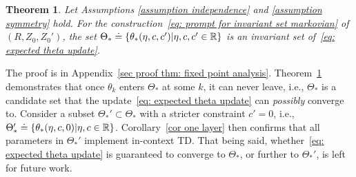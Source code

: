 \documentclass{article}
\newcommand{\R}{\mathbb{R}}
\newtheorem{theorem}{Theorem}
\begin{document}
\begin{theorem}
    Let Assumptions \ref{assumption independence} and \ref{assumption symmetry} hold.
    For the construction~\eqref{eq: prompt for invariant set markovian} of $(R, Z_0, Z_0')$,
    the set $\Theta_* \doteq \qty{\theta_*(\eta, c, c') | \eta, c, c' \in \R}$ is an invariant set of~\eqref{eq: expected theta update}.
\label{thm: fixed point analysis}
\end{theorem}
The proof is in Appendix~\ref{sec proof thm: fixed point analysis}. Theorem~\ref{thm: fixed point analysis} demonstrates that once $\theta_k$ enters $\Theta_*$ at some $k$,
it can never leave,
i.e.,
$\Theta_*$ is a candidate set that the update~\eqref{eq: expected theta update} can \emph{possibly} converge to.
Consider a subset $\Theta_*' \subset \Theta_*$ with a stricter constraint $c' = 0$,
i.e., $\Theta_*' \doteq \qty{\theta_*(\eta, c, 0) | \eta, c \in \R}$.
Corollary~\ref{cor one layer} then confirms that all parameters in $\Theta_*'$ implement in-context TD.
That being said,
whether~\eqref{eq: expected theta update} is guaranteed to converge to $\Theta_*$,
or further to $\Theta_*'$,
is left for future work.
\end{document}
